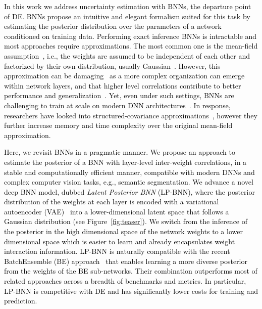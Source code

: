 \documentclass[10pt,twocolumn,letterpaper]{article}
\newcommand{\ab}[1]{\textcolor{black}{#1}}
\newcommand{\method}{LP-BNN\xspace}
\begin{document}
\ab{In this work we address uncertainty estimation with BNNs, the departure point of DE. BNNs propose an intuitive and elegant formalism suited for this task by estimating the posterior distribution over the parameters of a network conditioned on training data. Performing exact inference BNNs is intractable and most approaches require approximations. The most common one is the mean-field assumption~\cite{jordan1999introduction}, i.e., the weights are assumed to be independent of each other and factorized by their own distribution, usually Gaussian~\cite{hinton1993keeping, graves2011practical, blundell2015weight, hernandez2015probabilistic, gal2016dropout, mishkin2018slang}.
However, this approximation can be damaging~\cite{mackay1992practical, foong2020expressiveness} as a more complex organization can emerge within network layers, and that higher level correlations contribute to better performance and generalization~\cite{bengio2017deep,salimans2016weight,srivastava2014dropout}. Yet, even under such settings, BNNs are challenging to train at scale on modern DNN architectures~\cite{ovadia2019can, dusenberry2020efficient}.
In response, researchers have looked into structured-covariance approximations~\cite{louizos2016structured, sun2017learning, zhang2018noisy, mishkin2018slang}, however they further increase memory and time complexity over the original mean-field approximation.
}

\ab{Here, we revisit BNNs in a pragmatic manner. We propose an approach to estimate the posterior of a BNN with layer-level inter-weight correlations, in a stable and computationally efficient manner, compatible with modern DNNs and complex computer vision tasks, e.g., semantic segmentation. 
We advance a novel deep BNN model, dubbed \emph{Latent Posterior BNN} (LP-BNN), where the posterior distribution of the weights at each
layer is encoded with a variational autoencoder (VAE)~\cite{kingma13vae} into a lower-dimensional latent space that follows a Gaussian distribution (see Figure~\ref{fig:teaser}). We switch from the inference of the posterior in the high dimensional space of the network weights to a lower dimensional space which is easier to learn and already encapsulates weight interaction information. LP-BNN is naturally compatible with the recent BatchEnsemble (BE) approach~\cite{wen2020batchensemble} that enables learning a more diverse posterior from the weights of the BE sub-networks. Their combination outperforms most of related approaches across a breadth of benchmarks and metrics. In particular, \method is competitive with DE and has significantly lower costs for training and prediction.
}
\end{document}
